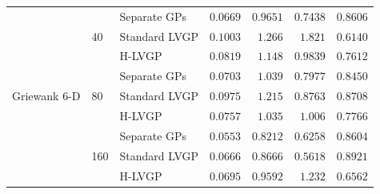 \begin{table}[htbp]
\begin{tabular}{lllrrrr}
\midrule
\multirow{9}{*}{Griewank 6-D} & \multirow{3}{*}{40} & Separate GPs & \colorbox{green!20}{\boldmath$0.0669$} & \colorbox{green!20}{\boldmath$0.9651$} & \colorbox{green!20}{\boldmath$0.7438$} & \colorbox{green!20}{\boldmath$0.8606$} \\
 &  & Standard LVGP & $0.1003$ & $1.266$ & $1.821$ & $0.6140$ \\
 &  & H-LVGP & $0.0819$ & $1.148$ & $0.9839$ & $0.7612$ \\
\cmidrule(lr){2-7}
 & \multirow{3}{*}{80} & Separate GPs & \colorbox{green!20}{\boldmath$0.0703$} & $1.039$ & \colorbox{green!20}{\boldmath$0.7977$} & $0.8450$ \\
 &  & Standard LVGP & $0.0975$ & $1.215$ & $0.8763$ & \colorbox{green!20}{\boldmath$0.8708$} \\
 &  & H-LVGP & $0.0757$ & \colorbox{green!20}{\boldmath$1.035$} & $1.006$ & $0.7766$ \\
\cmidrule(lr){2-7}
 & \multirow{3}{*}{160} & Separate GPs & \colorbox{green!20}{\boldmath$0.0553$} & \colorbox{green!20}{\boldmath$0.8212$} & $0.6258$ & $0.8604$ \\
 &  & Standard LVGP & $0.0666$ & $0.8666$ & \colorbox{green!20}{\boldmath$0.5618$} & \colorbox{green!20}{\boldmath$0.8921$} \\
 &  & H-LVGP & $0.0695$ & $0.9592$ & $1.232$ & $0.6562$ \\
\bottomrule
\end{tabular}
\end{table}
